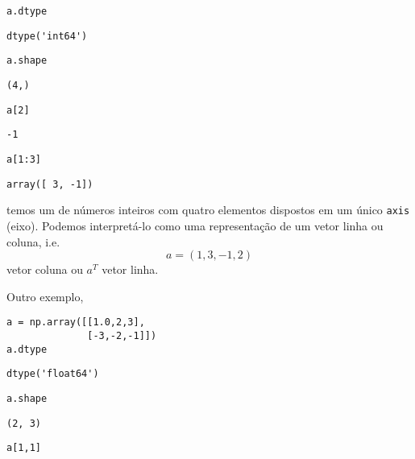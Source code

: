 \begin{lstlisting}
a.dtype
\end{lstlisting}

\begin{verbatim}
dtype('int64')
\end{verbatim}

\begin{lstlisting}
a.shape
\end{lstlisting}

\begin{verbatim}
(4,)
\end{verbatim}

\begin{lstlisting}
a[2]
\end{lstlisting}

\begin{verbatim}
-1
\end{verbatim}

\begin{lstlisting}
a[1:3]
\end{lstlisting}

\begin{verbatim}
array([ 3, -1])
\end{verbatim}

temos um {\PYTHONnumpyDOTarray} de números inteiros com quatro elementos dispostos em um único \texttt{axis} (eixo). Podemos interpretá-lo como uma representação de um vetor linha ou coluna, i.e.
\begin{equation}
  a = (1, 3, -1, 2)
\end{equation}
vetor coluna ou $a^T$ vetor linha.

Outro exemplo,

\begin{lstlisting}
a = np.array([[1.0,2,3],
              [-3,-2,-1]])
a.dtype
\end{lstlisting}

\begin{verbatim}
dtype('float64')
\end{verbatim}

\begin{lstlisting}
a.shape
\end{lstlisting}

\begin{verbatim}
(2, 3)
\end{verbatim}

\begin{lstlisting}
a[1,1]
\end{lstlisting}

